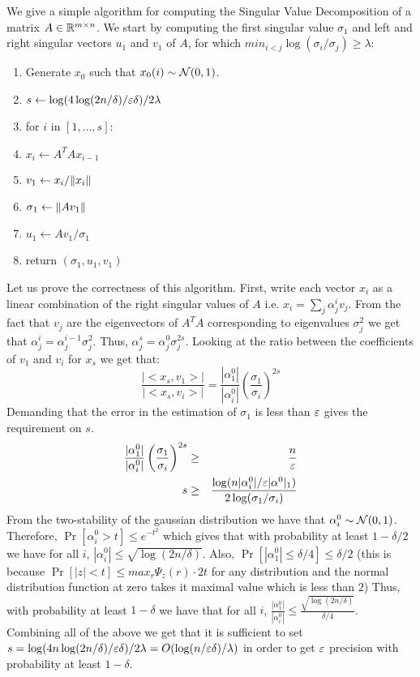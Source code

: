 \documentclass{article}
\begin{document}
We give a simple algorithm for computing the Singular Value Decomposition of a matrix $A \in {\mathbb{R}}^{m \times n}$.
We start by computing the first singular value $\sigma_1$ and left and right singular vectors $u_1$ and $v_1$ of $A$,
for which $min_{i<j}\log(\sigma_i/\sigma_j) \ge \lambda$:
\begin{enumerate}
\item Generate $x_0$ such that $x_0(i) \sim {\mathcal{N}}(0,1)$.
\item $s \leftarrow  \log(4\log(2n/\delta)/\varepsilon\delta)/2\lambda$ 
\item for $i$ in $[1,\ldots,s]$:
\item \tab $x_i \leftarrow A^{T}Ax_{i-1}$
\item $v_1 \leftarrow x_i/\| x_i \|$  
\item $\sigma_1 \leftarrow \| Av_1 \|$
\item $u_1 \leftarrow Av_1/\sigma_1$ 
\item return $(\sigma_1,u_1,v_1)$ 
\end{enumerate}
Let us prove the correctness of this algorithm.
First, write each vector $x_i$ as a linear combination of the right singular values of $A$ i.e. $x_i = \sum_{j} \alpha^{i}_{j}v_j$. 
From the fact that $v_j$ are the eigenvectors of $A^{T}A$ corresponding to eigenvalues $\sigma^{2}_j$ 
we get that $\alpha^{i}_{j}= \alpha^{i-1}_{j}\sigma^{2}_{j}$.
Thus, $\alpha^{s}_{j} = \alpha^{0}_{j}\sigma^{2s}_{j}$. Looking at the ratio between the coefficients of $v_1$ and $v_i$ for $x_s$
we get that:
 \[
 \frac{|<x_s,v_1>|}{|<x_s,v_i>|} = \frac{|\alpha^{0}_{1}|}{|\alpha^{0}_{i}|}\left(\frac{\sigma_1}{\sigma_i}\right)^{2s}
\]
Demanding that the error in the estimation of $\sigma_1$ is less than $\varepsilon$ gives the requirement on $s$.
\begin{eqnarray}
\frac{|\alpha^{0}_{1}|}{|\alpha^{0}_{i}|}\left(\frac{\sigma_1}{\sigma_i}\right)^{2s} &\ge& \frac{n}{\varepsilon}\\
s &\ge& \frac{\log(n|\alpha^{0}_i|/\varepsilon|\alpha^{0}|_1)}{2\log(\sigma_1/\sigma_i)}
\end{eqnarray}
From the two-stability of the gaussian distribution we have that $\alpha^{0}_i \sim {\mathcal{N}}(0,1)$. 
Therefore, $\Pr[\alpha^{0}_i > t] \le e^{-t^2}$ which gives that with probability at least $1-\delta/2$ we have for
all $i$, $|\alpha^{0}_i | \le \sqrt{\log(2n/\delta)}$. Also, $\Pr[|\alpha^{0}_1 | \le \delta/4 ] \le \delta/2$ (this is because 
$\Pr[|z| < t] \le max_{r}\Psi_{z}(r)\cdot2t$ for any distribution and the normal distribution function at zero takes it maximal value which is less than $2$) 
Thus, with probability at least $1-\delta$ we have that for all $i$, $\frac{|\alpha^{0}_{1}|}{|\alpha^{0}_{i}|} \le \frac{\sqrt{\log(2n/\delta)}}{\delta/4}$.
Combining all of the above we get that it is sufficient to set $s = \log(4n\log(2n/\delta)/\varepsilon\delta)/2\lambda = O(\log(n/\varepsilon\delta)/\lambda)$
in order to get $\varepsilon$ precision with probability at least $1-\delta$.
\end{document}
